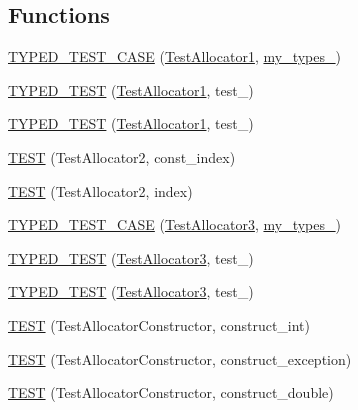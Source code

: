 \subsection*{Functions}
\begin{DoxyCompactItemize}
\item 
\hyperlink{TestAllocator_8c_09_09_ac12bb00f418021d252bd2c25ece50c93}{T\-Y\-P\-E\-D\-\_\-\-T\-E\-S\-T\-\_\-\-C\-A\-S\-E} (\hyperlink{structTestAllocator1}{Test\-Allocator1}, \hyperlink{TestAllocator_8c_09_09_a13869bd8140d5f03f67a74c18b4a9483}{my\-\_\-types\-\_})
\item 
\hyperlink{TestAllocator_8c_09_09_ae7f896b998cca25e9dd5fb6e0ee4eebc}{T\-Y\-P\-E\-D\-\_\-\-T\-E\-S\-T} (\hyperlink{structTestAllocator1}{Test\-Allocator1}, test\-\_)
\item 
\hyperlink{TestAllocator_8c_09_09_aa2803b82f1082b0ae849ad3075c944ad}{T\-Y\-P\-E\-D\-\_\-\-T\-E\-S\-T} (\hyperlink{structTestAllocator1}{Test\-Allocator1}, test\-\_)
\item 
\hyperlink{TestAllocator_8c_09_09_a204cc10f9bc1ca26b04bad4656b87671}{T\-E\-S\-T} (Test\-Allocator2, const\-\_\-index)
\item 
\hyperlink{TestAllocator_8c_09_09_a4da97a8aeec81f53d36b25e8483d51ec}{T\-E\-S\-T} (Test\-Allocator2, index)
\item 
\hyperlink{TestAllocator_8c_09_09_a2834e7174b70f38555c1dc1808e6ce3b}{T\-Y\-P\-E\-D\-\_\-\-T\-E\-S\-T\-\_\-\-C\-A\-S\-E} (\hyperlink{structTestAllocator3}{Test\-Allocator3}, \hyperlink{TestAllocator_8c_09_09_ae8c7ebc24b7c1269b8c59135bef34e20}{my\-\_\-types\-\_})
\item 
\hyperlink{TestAllocator_8c_09_09_a0a98bdf8c103a8a929e22e100a185ea2}{T\-Y\-P\-E\-D\-\_\-\-T\-E\-S\-T} (\hyperlink{structTestAllocator3}{Test\-Allocator3}, test\-\_)
\item 
\hyperlink{TestAllocator_8c_09_09_a8160ba0a226c52d48c08bf80c72fde03}{T\-Y\-P\-E\-D\-\_\-\-T\-E\-S\-T} (\hyperlink{structTestAllocator3}{Test\-Allocator3}, test\-\_)
\item 
\hyperlink{TestAllocator_8c_09_09_a7e0f24656a410bacb1041e5c2dd07801}{T\-E\-S\-T} (Test\-Allocator\-Constructor, construct\-\_\-int)
\item 
\hyperlink{TestAllocator_8c_09_09_af0ede47de50329774cb3d71b3e640bb1}{T\-E\-S\-T} (Test\-Allocator\-Constructor, construct\-\_\-exception)
\item 
\hyperlink{TestAllocator_8c_09_09_aa9ecbe57010651a59974079b34ec6ac7}{T\-E\-S\-T} (Test\-Allocator\-Constructor, construct\-\_\-double)

\end{DoxyCompactItemize}
